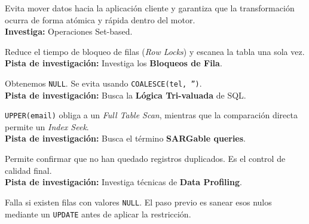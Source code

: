 \documentclass[12pt,a4paper]{article}
\begin{document}
\begin{tcolorbox}[title=Respuesta 3: Atomicidad y Eficiencia]
Evita mover datos hacia la aplicación cliente y garantiza que la transformación ocurra de forma atómica y rápida dentro del motor. \\
\textbf{Investiga:} Operaciones Set-based.
\end{tcolorbox}

\begin{tcolorbox}[title=Respuesta 4: Eficiencia de Proceso]
Reduce el tiempo de bloqueo de filas (\textit{Row Locks}) y escanea la tabla una sola vez. \\
\textbf{Pista de investigación:} Investiga los \textbf{Bloqueos de Fila}.
\end{tcolorbox}

\begin{tcolorbox}[title=Respuesta 5: El vacío del NULL]
Obtenemos \texttt{NULL}. Se evita usando \texttt{COALESCE(tel, '')}. \\
\textbf{Pista de investigación:} Busca la \textbf{Lógica Tri-valuada} de SQL.
\end{tcolorbox}

\begin{tcolorbox}[title=Respuesta 6: SARGability]
\texttt{UPPER(email)} obliga a un \textit{Full Table Scan}, mientras que la comparación directa permite un \textit{Index Seek}. \\
\textbf{Pista de investigación:} Busca el término \textbf{SARGable queries}.
\end{tcolorbox}

\begin{tcolorbox}[title=Respuesta 7: Validación de Calidad]
Permite confirmar que no han quedado registros duplicados. Es el control de calidad final. \\
\textbf{Pista de investigación:} Investiga técnicas de \textbf{Data Profiling}.
\end{tcolorbox}

\begin{tcolorbox}[title=Respuesta 8: El cerrojo de la obligatoriedad]
Falla si existen filas con valores \texttt{NULL}. El paso previo es sanear esos nulos mediante un \texttt{UPDATE} antes de aplicar la restricción.
\end{tcolorbox}
\end{document}
